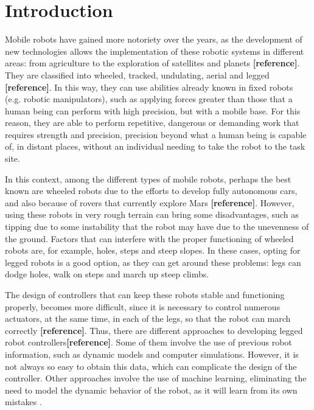 
\section{Introduction}
Mobile robots have gained more notoriety over the years, as the development of new technologies allows the implementation of these robotic systems in different areas: from agriculture to the exploration of satellites and planets \textbf{[reference]}. They are classified into wheeled, tracked, undulating, aerial and legged \textbf{[reference]}. In this way, they can use abilities already known in fixed robots (e.g. robotic manipulators), such as applying forces greater than those that a human being can perform with high precision, but with a mobile base. For this reason, they are able to perform repetitive, dangerous or demanding work that requires strength and precision, precision beyond what a human being is capable of, in distant places, without an individual needing to take the robot to the task site.

In this context, among the different types of mobile robots, perhaps the best known are wheeled robots due to the efforts to develop fully autonomous cars, and also because of rovers that currently explore Mars \textbf{[reference]}. However, using these robots in very rough terrain can bring some disadvantages, such as tipping due to some instability that the robot may have due to the unevenness of the ground. Factors that can interfere with the proper functioning of wheeled robots are, for example, holes, steps and steep slopes. In these cases, opting for legged robots is a good option, as they can get around these problems: legs can dodge holes, walk on steps and march up steep climbs.

The design of controllers that can keep these robots stable and functioning properly, becomes more difficult, since it is necessary to control numerous actuators, at the same time, in each of the legs, so that the robot can march correctly \textbf{[reference]}. Thus, there are different approaches to developing legged robot controllers\textbf{[reference]}. Some of them involve the use of previous robot information, such as dynamic models and computer simulations. However, it is not always so easy to obtain this data, which can complicate the design of the controller. Other approaches involve the use of machine learning, eliminating the need to model the dynamic behavior of the robot, as it will learn from its own mistakes \cite{kormushev2013reinforcement}.

